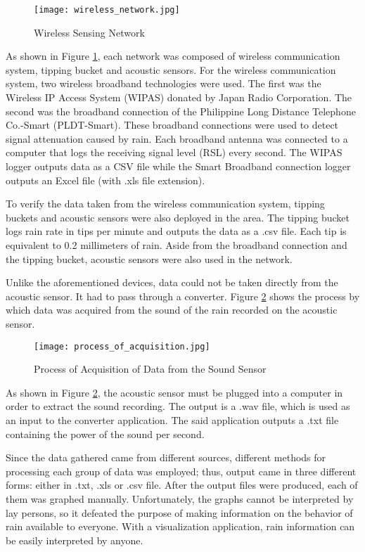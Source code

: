 \begin{figure}
	\centering
		\texttt{[image: wireless\_network.jpg]}
	\caption{Wireless Sensing Network}
	\label{fig:wireless_network}
\end{figure}

\bigskip
As shown in Figure \ref{fig:wireless_network}, each network was composed of wireless communication system, tipping bucket and acoustic sensors. For the wireless communication system, two wireless broadband technologies were used. The first was the Wireless IP Access System (WIPAS) donated by Japan Radio Corporation. The second was the broadband connection of the Philippine Long Distance Telephone Co.-Smart (PLDT-Smart). These broadband connections were used to detect signal attenuation caused by rain. Each broadband antenna was connected to a computer that logs the receiving signal level (RSL) every second. The WIPAS logger outputs data as a CSV file while the Smart Broadband connection logger outputs an Excel file (with .xls file extension).

\bigskip
To verify the data taken from the wireless communication system, tipping buckets and acoustic sensors were also deployed in the area. The tipping bucket logs rain rate in tips per minute and outputs the data as a .csv file. Each tip is equivalent to 0.2 millimeters of rain. Aside from the broadband connection and the tipping bucket, acoustic sensors were also used in the network.

\bigskip
Unlike the aforementioned devices, data could not be taken directly from the acoustic sensor. It had to pass through a converter. Figure \ref{fig:process_of_acquisition} shows the process by which data was acquired from the sound of the rain recorded on the acoustic sensor.

\begin{figure}
	\centering
		\texttt{[image: process\_of\_acquisition.jpg]}
	\caption{Process of Acquisition of Data from the Sound Sensor}
	\label{fig:process_of_acquisition}
\end{figure}

\bigskip
As shown in Figure \ref{fig:process_of_acquisition}, the acoustic sensor must be plugged into a computer in order to extract the sound recording. The output is a .wav file, which is used as an input to the converter application. The said application outputs a .txt file containing the power of the sound per second.

\bigskip
Since the data gathered came from different sources, different methods for processing each group of data was employed; thus, output came in three different forms: either in .txt, .xls or .csv file. After the output files were produced, each of them was graphed manually. Unfortunately, the graphs cannot be interpreted by lay persons, so it defeated the purpose of making information on the behavior of rain available to everyone. With a visualization application, rain information can be easily interpreted by anyone.


